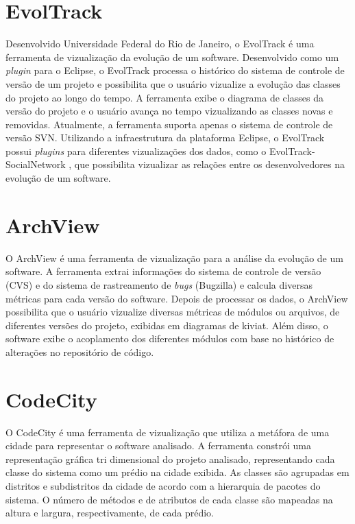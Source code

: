 \documentclass[a4paper, 12pt, twoside]{book}
\begin{document}
\section*{EvolTrack}
    Desenvolvido Universidade Federal do Rio de Janeiro, o EvolTrack é uma ferramenta de vizualização da evolução de um software. Desenvolvido como um \textit{plugin} para o Eclipse, o EvolTrack processa o histórico do sistema de controle de versão de um projeto e possibilita que o usuário vizualize a evolução das classes do projeto ao longo do tempo. A ferramenta exibe o diagrama de classes da versão do projeto e o usuário avança no tempo vizualizando as classes novas e removidas. Atualmente, a ferramenta suporta apenas o sistema de controle de versão SVN. Utilizando a infraestrutura da plataforma Eclipse, o EvolTrack possui \textit{plugins} para diferentes vizualizações dos dados, como o EvolTrack-SocialNetwork \cite{vahia:11}, que possibilita vizualizar as relações entre os desenvolvedores na evolução de um software.

\section*{ArchView}
    O ArchView \cite{pinzger:05} é uma ferramenta de vizualização para a análise da evolução de um software. A ferramenta extrai informações do sistema de controle de versão (CVS) e do sistema de rastreamento de \textit{bugs} (Bugzilla) e calcula diversas métricas para cada versão do software. Depois de processar os dados, o ArchView possibilita que o usuário vizualize diversas métricas de módulos ou arquivos, de diferentes versões do projeto, exibidas em diagramas de kiviat. Além disso, o software exibe o acoplamento dos diferentes módulos com base no histórico de alterações no repositório de código.

\section*{CodeCity}
    O CodeCity \cite{wettel07} é uma ferramenta de vizualização que utiliza a metáfora de uma cidade para representar o software analisado. A ferramenta constrói uma representação gráfica tri dimensional do projeto analisado, representando cada classe do sistema como um prédio na cidade exibida. As classes são agrupadas em distritos e subdistritos da cidade de acordo com a hierarquia de pacotes do sistema. O número de métodos e de atributos de cada classe são mapeadas na altura e largura, respectivamente, de cada prédio.
\end{document}
